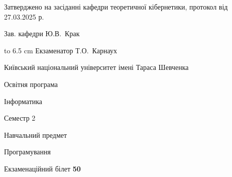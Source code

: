 \documentclass[12pt, ukrainian]{article}
\begin{document}
{\smallskip\smallskip \begin {scriptsize} Затверджено на засіданні кафедри теоретичної кібернетики, протокол   від   27.03.2025 р.\par\smallskip\smallskip\smallskip\smallskip
{\parbox {6.5 cm} {Зав. кафедри \dotfill Ю.В.~Крак}}\hspace {0.7cm} {\hbox to 6.5 cm { Екзаменатор \dotfill Т.О.~Карнаух}} \end{scriptsize}}
\newpage
{{\begin {scriptsize}\par
{ \center  Київський національний університет імені Тараса Шевченка \par}
{\parbox {5 cm}{Освітня програма \hfill}{\parbox {7 cm}{Інформатика\hfill}}\parbox {6 cm}{\hfill Семестр 2}}\par
{\parbox {5 cm} {Навчальний предмет \hfill}\parbox {7 cm}{Програмування \hfill}\parbox {6cm}{\hfill}\par}\vspace{-15pt} \end{scriptsize}}{\center Екзаменаційний білет \No \textbf { 50 }\par}}
\end{document}
